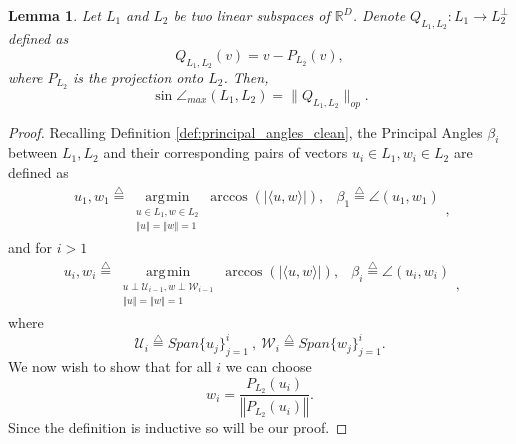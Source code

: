 \documentclass[12pt]{article}
\newtheorem{Lemma}[Theorem]{Lemma}
\theoremstyle{remark}
\newcommand{\RR}{\mathbb{R}}
\newcommand{\UU}{\mathcal{U}}
\newcommand{\WW}{\mathcal{W}}
\newcommand{\defeq}{\stackrel{\bigtriangleup}{=}}
\newcommand{\abs}[1]{\left\vert #1 \right\vert}
\newcommand{\norm}[1]{\left\Vert #1 \right\Vert}
\DeclareMathOperator*{\argmin}{\arg\!\min}
\begin{document}
\begin{appendices}
\begin{Lemma}\label{lem:Q_angle_between_flats}
    Let $L_1$ and $L_2$ be two linear subspaces of $\RR^D$. Denote $Q_{L_1,L_2}:L_1 \rightarrow L_2^\perp$ defined as
    \[
    Q_{L_1,L_2}(v) = v - P_{L_2}(v)
    ,\]
    where $ P_{L_2} $ is the projection onto $ L_2 $.
    Then, 
    \[
    \sin \angle_{max}(L_1,L_2) = \|Q_{L_1,L_2}\|_{op}
    .\]
\end{Lemma}
\begin{proof}
	Recalling Definition \ref{def:principal_angles_clean}, the Principal Angles $ \beta_i $ between  $ L_1, L_2 $ and their corresponding pairs of vectors $ u_i\in L_1, w_i\in L_2 $ are defined as
	\begin{equation*}
	\begin{array}{ll}
	u_1, w_1 \defeq \argmin\limits_{\substack{u\in L_1, w\in L_2 \\ \norm{u}=\norm{w} =1}}\arccos\left(\abs{\langle u, w \rangle}\right), &
	\beta_1 \defeq \angle(u_1, w_1)
	\end{array}    
	,\end{equation*}
	and for $i > 1$
	\begin{equation*}
	\begin{array}{ll}
	u_i, w_i \defeq \argmin\limits_{\substack{u\perp\UU_{i-1}, w\perp\WW_{i-1} \\ \norm{u}=\norm{w} =1}}\arccos\left(\abs{\langle u, w \rangle}\right), &
	\beta_i \defeq \angle(u_i, w_i)
	\end{array}
	,\end{equation*}
	where $$\UU_i \defeq Span\{u_j\}_{j=1}^i ~,~ \WW_i \defeq Span\{w_j\}_{j=1}^i.$$
	We now wish to show that for all $ i $ we can choose
	\[
	w_i = \frac{P_{L_2}(u_i)}{\norm{P_{L_2}(u_i)}}
	.\]
	Since the definition is inductive so will be our proof.

\end{proof}
\end{appendices}
\end{document}
